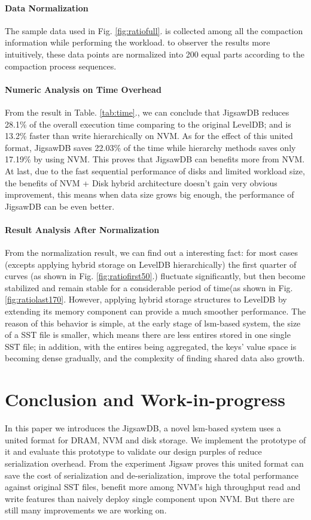 \paragraph{Data Normalization} The sample data used in Fig. \ref{fig:ratiofull}. is collected among all the compaction information while performing the workload. to observer the results more intuitively, these data points are normalized into 200 equal parts according to the compaction process sequences. 

\paragraph{Numeric Analysis on Time Overhead} From the result in Table. \ref{tab:time}., we can conclude that JigsawDB reduces 28.1\% of the overall execution time comparing to the original LevelDB; and is 13.2\% faster than write hierarchically on NVM. As for the effect of this united format, JigsawDB saves 22.03\% of the time while hierarchy methods saves only 17.19\% by using NVM. This proves that JigsawDB can benefits more from NVM. At last, due to the fast sequential performance of disks and limited workload size, the benefits of NVM + Disk hybrid architecture doesn't gain very obvious improvement, this means when data size grows big enough, the performance of JigsawDB can be even better. 

\paragraph{Result Analysis After Normalization} 

From the normalization result, we can find out a interesting fact: for most cases (excepts applying hybrid storage on LevelDB hierarchically) the first quarter of curves (as shown in Fig.  \ref{fig:ratiofirst50}.) fluctuate significantly, but then become stabilized and remain stable for a considerable period of time(as shown in Fig. \ref{fig:ratiolast170}. However, applying hybrid storage structures to LevelDB by extending its memory component can provide a much smoother performance. The reason of this behavior is simple, at the early stage of lsm-based system, the size of a SST file is smaller, which means there are less entires stored in one single SST file; in addition, with the entires being aggregated, the keys' value space is becoming dense gradually, and the complexity of finding shared data also growth. 



\section{Conclusion and Work-in-progress}
In this paper we introduces the JigsawDB, a novel lsm-based system uses a united format for DRAM, NVM and disk storage. We implement the prototype of it and evaluate this prototype to validate our design purples of reduce serialization overhead. From the experiment Jigsaw proves this united format can save the cost of serialization and de-serialization, improve the total performance against original SST files, benefit more among NVM's high throughput read and write features than naively deploy single component upon NVM. But there are still many improvements we are working on.

